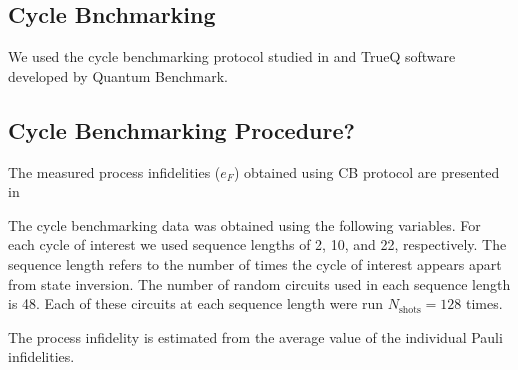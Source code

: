 \subsection{Cycle Bnchmarking}

\label{sec:cb}
We used the cycle benchmarking protocol studied in \cite{Erhard2019} and TrueQ software developed by Quantum Benchmark.



\subsection{Cycle Benchmarking Procedure?}
The measured process infidelities ($e_F$) obtained using CB protocol are presented in 


The cycle benchmarking data was obtained using the following variables. For each cycle of interest we used sequence lengths of 2, 10, and 22, respectively. The sequence length refers to the number of times the cycle of interest appears apart from state inversion. The number of random circuits used in each sequence length is 48. Each of these circuits at each sequence length were run $N_\text{shots}=128$ times. 

The process infidelity is estimated from the average value of the individual Pauli infidelities.



